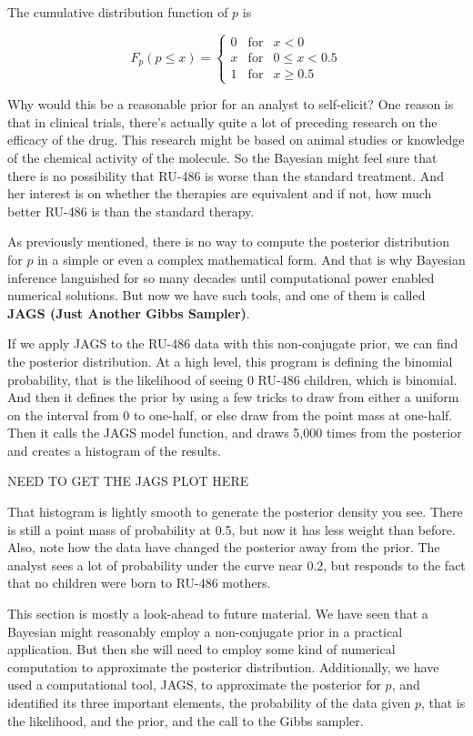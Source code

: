 \documentclass[]{book}
\theoremstyle{definition}
\theoremstyle{definition}
\theoremstyle{remark}
\begin{document}
The cumulative distribution function of \(p\) is

\[F_p(p \leq x) = \left\{ \begin{array}{ccc}
0 & \text{for} & x < 0 \\
x & \text{for} & 0 \leq x < 0.5  \\
1 & \text{for} & x \geq 0.5
\end{array}\right.\]

Why would this be a reasonable prior for an analyst to self-elicit? One
reason is that in clinical trials, there's actually quite a lot of
preceding research on the efficacy of the drug. This research might be
based on animal studies or knowledge of the chemical activity of the
molecule. So the Bayesian might feel sure that there is no possibility
that RU-486 is worse than the standard treatment. And her interest is on
whether the therapies are equivalent and if not, how much better RU-486
is than the standard therapy.

As previously mentioned, there is no way to compute the posterior
distribution for \(p\) in a simple or even a complex mathematical form.
And that is why Bayesian inference languished for so many decades until
computational power enabled numerical solutions. But now we have such
tools, and one of them is called \textbf{JAGS (Just Another Gibbs
Sampler)}.

If we apply JAGS to the RU-486 data with this non-conjugate prior, we
can find the posterior distribution. At a high level, this program is
defining the binomial probability, that is the likelihood of seeing 0
RU-486 children, which is binomial. And then it defines the prior by
using a few tricks to draw from either a uniform on the interval from 0
to one-half, or else draw from the point mass at one-half. Then it calls
the JAGS model function, and draws 5,000 times from the posterior and
creates a histogram of the results.

NEED TO GET THE JAGS PLOT HERE

That histogram is lightly smooth to generate the posterior density you
see. There is still a point mass of probability at 0.5, but now it has
less weight than before. Also, note how the data have changed the
posterior away from the prior. The analyst sees a lot of probability
under the curve near 0.2, but responds to the fact that no children were
born to RU-486 mothers.

This section is mostly a look-ahead to future material. We have seen
that a Bayesian might reasonably employ a non-conjugate prior in a
practical application. But then she will need to employ some kind of
numerical computation to approximate the posterior distribution.
Additionally, we have used a computational tool, JAGS, to approximate
the posterior for \(p\), and identified its three important elements,
the probability of the data given \(p\), that is the likelihood, and the
prior, and the call to the Gibbs sampler.
\end{document}
